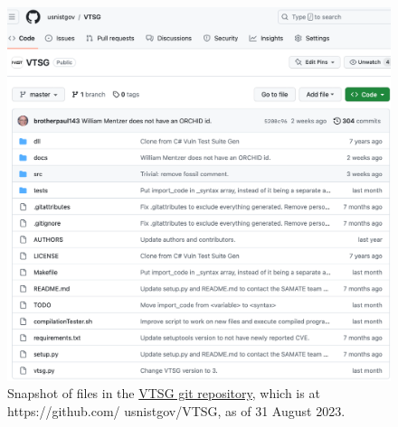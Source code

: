 \begin{appendices}
\begin{figure}[htbp]
  \includegraphics[width=1\linewidth]{fig_git_files.png}
  \caption{Snapshot of files in the
    \href{https://github.com/usnistgov/VTSG}{VTSG git repository}, which is at
    https://github.com/ usnistgov/VTSG,
    as of 31 August 2023.}
  \label{fig:git files}
\end{figure}


\end{appendices}
